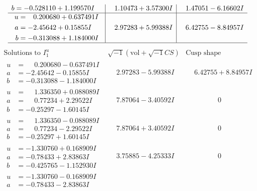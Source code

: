 \documentclass[1p]{elsarticle_modified}
\theoremstyle{definition}
\newcommand{\I}{\sqrt{-1}}
\begin{document}
$$\begin{array}{c|c|c}
\begin{aligned}
b &= -0.528110 + 1.199570 I\end{aligned}
 & \phantom{-}1.10473 + 3.57300 I & \phantom{-}1.47051 - 6.16602 I \\ \hline\begin{aligned}
u &= \phantom{-}0.200680 + 0.637491 I \\
a &= -2.45642 + 0.15855 I \\
b &= -0.313088 + 1.184000 I\end{aligned}
 & \phantom{-}2.97283 + 5.99388 I & \phantom{-}6.42755 - 8.84957 I\\
 \hline 
 \end{array}$$\newpage$$\begin{array}{c|c|c}  
\text{Solutions to }I^u_{1}& \I (\text{vol} + \sqrt{-1}CS) & \text{Cusp shape}\\
 \hline 
\begin{aligned}
u &= \phantom{-}0.200680 - 0.637491 I \\
a &= -2.45642 - 0.15855 I \\
b &= -0.313088 - 1.184000 I\end{aligned}
 & \phantom{-}2.97283 - 5.99388 I & \phantom{-}6.42755 + 8.84957 I \\ \hline\begin{aligned}
u &= \phantom{-}1.336350 + 0.088089 I \\
a &= \phantom{-}0.77234 + 2.29522 I \\
b &= -0.25297 - 1.60145 I\end{aligned}
 & \phantom{-}7.87064 - 3.40592 I & \phantom{-0.000000 } 0 \\ \hline\begin{aligned}
u &= \phantom{-}1.336350 - 0.088089 I \\
a &= \phantom{-}0.77234 - 2.29522 I \\
b &= -0.25297 + 1.60145 I\end{aligned}
 & \phantom{-}7.87064 + 3.40592 I & \phantom{-0.000000 } 0 \\ \hline\begin{aligned}
u &= -1.330760 + 0.168909 I \\
a &= -0.78433 + 2.83863 I \\
b &= -0.425765 - 1.152930 I\end{aligned}
 & \phantom{-}3.75885 - 4.25333 I & \phantom{-0.000000 } 0 \\ \hline\begin{aligned}
u &= -1.330760 - 0.168909 I \\
a &= -0.78433 - 2.83863 I \\

\end{aligned}
\end{array}$$
\end{document}
